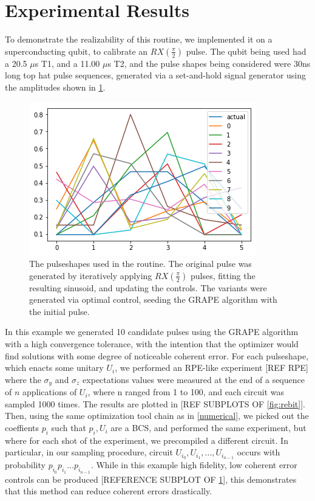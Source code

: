 \documentclass[aps,nofootinbib,pra,notitlepage,twocolumn]{revtex4-1}
\begin{document}
\section{Experimental Results}\label{experimental}
To demonstrate the realizability of this routine, we implemented it on a superconducting qubit, to calibrate an $RX(\frac{\pi}{2})$ pulse. The qubit being used had a 20.5 $\mu$s T1, and a 11.00 $\mu$s T2, and the pulse shapes being considered were 30ns long top hat pulse sequences, generated via a set-and-hold signal generator using the amplitudes shown in \ref{fig:pulseshapes}. 
\begin{figure}[H]
  \centering
  \includegraphics[width=.75\columnwidth]{pulseshapes.png}
  \caption{The pulseshapes used in the routine. The original pulse was generated by iteratively applying $RX(\frac{\pi}{2})$ pulses, fitting the resulting sinusoid, and updating the controls. The variants were generated via optimal control, seeding the GRAPE algorithm with the initial pulse.}
  \label{fig:pulseshapes}
\end{figure}

In this example we generated 10 candidate pulses using the GRAPE algorithm with a high convergence tolerance, with the intention that the optimizer would find solutions with some degree of noticeable coherent error. For each pulseshape, which enacts some unitary $U_i$, we performed an RPE-like experiment [REF RPE] where the $\sigma_y$ and $\sigma_z$ expectations values were measured at the end of a sequence of $n$ applications of $U_i$, where n ranged from 1 to 100, and each circuit was sampled 1000 times. The results are plotted in [REF SUBPLOTS OF \ref{fig:rebit}]. Then, using the same optimization tool chain as in \ref{numerical}, we picked out the coeffients $p_i$ such that $p_i, U_i$ are a BCS, and performed the same experiment, but where for each shot of the experiment, we precompiled a different circuit. In particular, in our sampling procedure, circuit $U_{i_0}, U_{i_1}, ..., U_{i_{n-1}}$ occurs with probability $p_{i_0}p_{i_1}...p_{i_{n-1}}$. While in this example high fidelity, low coherent error controls can be produced [REFERENCE SUBPLOT OF \ref{fig:pulseshapes}], this demonstrates that this method can reduce coherent errors drastically.
\end{document}
